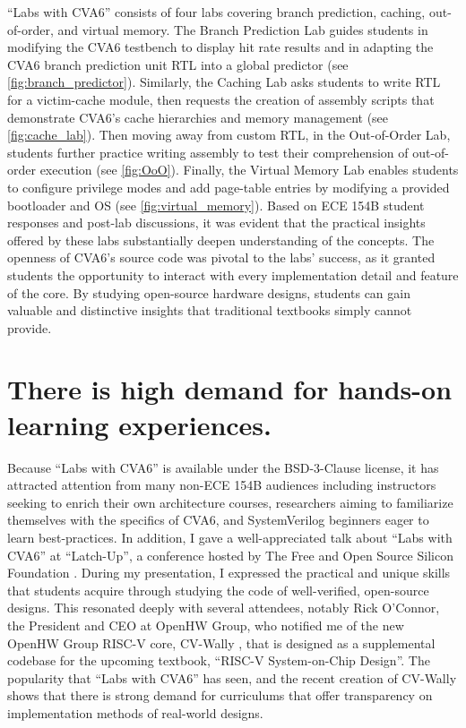 \enquote{Labs with CVA6} consists of four labs covering branch prediction, caching, out-of-order, and virtual memory. The Branch Prediction Lab guides students in modifying the CVA6 testbench to display hit rate results and in adapting the CVA6 branch prediction unit RTL into a global predictor (see \autoref{fig:branch_predictor}). Similarly, the Caching Lab asks students to write RTL for a victim-cache module, then requests the creation of assembly scripts that demonstrate CVA6's cache hierarchies and memory management (see \autoref{fig:cache_lab}). Then moving away from custom RTL, in the Out-of-Order Lab, students further practice writing assembly to test their comprehension of out-of-order execution (see \autoref{fig:OoO}). Finally, the Virtual Memory Lab enables students to configure privilege modes and add page-table entries by modifying a provided bootloader and OS (see \autoref{fig:virtual_memory}). Based on ECE 154B student responses and post-lab discussions, it was evident that the practical insights offered by these labs substantially deepen understanding of the concepts. The openness of CVA6's source code was pivotal to the labs' success, as it granted students the opportunity to interact with every implementation detail and feature of the core. By studying open-source hardware designs, students can gain valuable and distinctive insights that traditional textbooks simply cannot provide.

\FloatBarrier

\section{There is high demand for hands-on learning experiences.}

Because \enquote{Labs with CVA6} is available under the BSD-3-Clause license, it has attracted attention from many non-ECE 154B audiences including instructors seeking to enrich their own architecture courses, researchers aiming to familiarize themselves with the specifics of CVA6, and SystemVerilog beginners eager to learn best-practices. In addition, I gave a well-appreciated talk about \enquote{Labs with CVA6} at \enquote{Latch-Up}, a conference hosted by The Free and Open Source Silicon Foundation \cite{SiffermanLatchUp}. During my presentation, I expressed the practical and unique skills that students acquire through studying the code of well-verified, open-source designs. This resonated deeply with several attendees, notably Rick O'Connor, the President and CEO at OpenHW Group, who notified me of the new OpenHW Group RISC-V core, CV-Wally \cite{cvwally}, that is designed as a supplemental codebase for the upcoming textbook, \enquote{RISC-V System-on-Chip Design}. The popularity that \enquote{Labs with CVA6} has seen, and the recent creation of CV-Wally shows that there is strong demand for curriculums that offer transparency on implementation methods of real-world designs.
